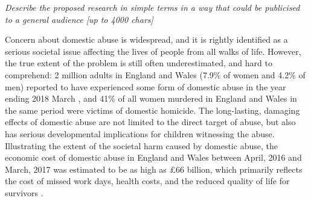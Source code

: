 \documentclass[11pt, a4paper]{article}
\begin{document}
\textit{Describe the proposed research in simple terms in a way that could be publicised to a general audience [up to 4000 chars]}

Concern about domestic abuse is widespread, and it is rightly identified as a serious societal issue affecting the lives of people from all walks of life. However, the true extent of the problem is still often underestimated, and hard to comprehend: 2 million adults in England and Wales (7.9\% of women and 4.2\% of men) reported to have experienced some form of domestic abuse in the year ending 2018 March \cite{ONS}, and 41\% of all women murdered in England and Wales in the same period were victims of domestic homicide. The long-lasting, damaging effects of domestic abuse are not limited to the direct target of abuse, but also has serious developmental implications for children witnessing the abuse. Illustrating the extent of the societal harm caused by domestic abuse, the economic cost of domestic abuse in England and Wales between April, 2016 and March, 2017 was estimated to be as high as \pounds 66 billion, which primarily reflects the cost of missed work days, health costs, and the reduced quality of life for survivors \cite{costs}.



\end{document}
